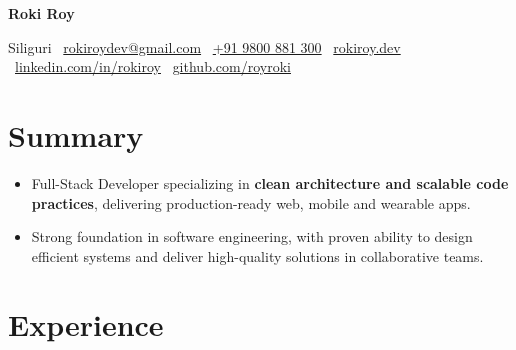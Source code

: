 \documentclass[10pt, letterpaper]{article}
\newenvironment{highlights}{
    \begin{itemize}[topsep=0.15cm, parsep=0.10cm, itemsep=0pt, leftmargin=10pt]
}{
    \end{itemize}
}
\newenvironment{onecolentry}{\begin{adjustwidth}{0cm}{0cm}}{\end{adjustwidth}}
\newenvironment{header}{
    \setlength{\topsep}{0pt}\par\kern\topsep\centering\linespread{1.3}
}{\par\kern\topsep}
\begin{document}
\begin{header}
    \fontsize{24pt}{24pt}\selectfont \textbf{Roki Roy}

    \vspace{4pt}

    \normalsize
    Siliguri \textbar\ 
    \href{mailto:rokiroydev@gmail.com}{rokiroydev@gmail.com} \textbar\ 
    \href{tel:+91-980-088-13-00}{+91 9800 881 300} \textbar\ 
    \href{https://dev.rokhub.shop/}{rokiroy.dev} \textbar\ 
    \href{https://linkedin.com/in/rokiroy}{linkedin.com/in/rokiroy} \textbar\ 
    \href{https://github.com/royroki}{github.com/royroki}
\end{header}

\vspace{-0.3cm}
\section{Summary}
\begin{onecolentry}
    \begin{highlights}
        \item Full-Stack Developer specializing in \textbf{clean architecture and scalable code practices}, delivering production-ready web, mobile and wearable apps.
        \item Strong foundation in software engineering, with proven ability to design efficient systems and deliver high-quality solutions in collaborative teams.
    \end{highlights}
\end{onecolentry}


\vspace{-0.1cm}
\section{Experience}
\end{document}
